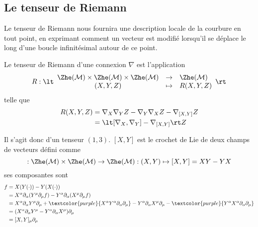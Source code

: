 \subsection{Le tenseur de Riemann}
Le tenseur de Riemann nous fournira une description locale de la courbure en tout point, en exprimant comment un vecteur est modifié lorsqu'il se déplace le long d'une boucle infinitésimal autour de ce point. 

\begin{theoremframe}
    \begin{defi}
        Le tenseur de Riemann d'une connexion $\nabla$ est l'application 
        \begin{align}
            R : \lt \begin{array}{ccl}
                \Zhe (\mathcal{M}) \times \Zhe (\mathcal{M}) \times \Zhe (\mathcal{M}) & \to & \Zhe(\mathcal{M}) \\
                (X,Y,Z) & \mapsto & R(X,Y,Z)
            \end{array}
            \rt
        \end{align}
        telle que
        \begin{align}
            R(X,Y,Z) &=\nabla_{X}\nabla_{Y}Z - \nabla_{Y}\nabla_{X}Z - \nabla_{[X, Y]}Z\\
            &= \lt [\nabla_X,\nabla_Y] - \nabla_{[X,Y]} \rt Z
        \end{align}
    \end{defi}
\end{theoremframe}
Il s'agit donc d'un tenseur $(1,3)$. $[X, Y]$ est le crochet de Lie de deux champs de vecteurs défini comme
\begin{equation}
     [\quad]:\Zhe(\mathcal{M})\times \Zhe(\mathcal{M}) \rightarrow \Zhe(\mathcal{M}) : (X, Y) \mapsto [X, Y]= XY -YX
\end{equation}
ses composantes sont
\begin{align}
    [X, Y]f &= X(Y(\cdot)) - Y(X(\cdot))\\
    &= X^{\alpha}\partial_{\alpha}(Y^{\mu}\partial_{\mu}f) - Y^{\alpha}\partial_{\alpha}(X^{\mu}\partial_{\mu}f)\\
    &= X^{\alpha}\partial_{\alpha}Y^{\mu}\partial_{\mu} + \textcolor{purple}{X^{\alpha}Y^{\alpha}\partial_{\alpha}\partial_{\mu}} - Y^{\alpha}\partial_{\alpha}X^{\mu}\partial_{\mu} - \textcolor{purple}{Y^{\alpha}X^{\alpha}\partial_{\alpha}\partial_{\mu}}\\
    &= (X^{\alpha}\partial_{\alpha}Y^{\mu} - Y^{\alpha}\partial_{\alpha}X^{\mu} )\partial_{\mu}\\
    &= [X, Y]_{\mu}\partial_{\mu}
\end{align}

